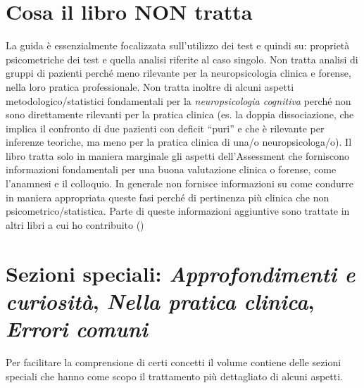 \documentclass[
  italian,
  letterpaper,
  paper=6in:9in,
  pagesize=pdftex,
  headinclude=on,
  footinclude=on,
  11pt]{scrbook}
\begin{document}
\section*{Cosa il libro NON tratta}\label{cosa-il-libro-non-tratta}


La guida è essenzialmente focalizzata sull'utilizzo dei test e quindi
su: proprietà psicometriche dei test e quella analisi riferite al caso
singolo. Non tratta analisi di gruppi di pazienti perché meno rilevante
per la neuropsicologia clinica e forense, nella loro pratica
professionale. Non tratta inoltre di alcuni aspetti
metodologico/statistici fondamentali per la \emph{neuropsicologia
cognitiva} perché non sono direttamente rilevanti per la pratica clinica
(es. la doppia dissociazione, che implica il confronto di due pazienti
con deficit ``puri'' e che è rilevante per inferenze teoriche, ma meno
per la pratica clinica di una/o neuropsicologa/o). Il libro tratta solo
in maniera marginale gli aspetti dell'Assessment che forniscono
informazioni fondamentali per una buona valutazione clinica o forense,
come l'anamnesi e il colloquio. In generale non fornisce informazioni su
come condurre in maniera appropriata queste fasi perché di pertinenza
più clinica che non psicometrico/statistica. Parte di queste
informazioni aggiuntive sono trattate in altri libri a cui ho
contribuito
(\cite{mondini2009valutazione,mondini2016semeiotica,mondini2022methodology})

\section*{\texorpdfstring{Sezioni speciali: \emph{Approfondimenti e
curiosità}, \emph{Nella pratica clinica}, \emph{Errori
comuni}}{Sezioni speciali: Approfondimenti e curiosità, Nella pratica clinica, Errori comuni}}\label{sezioni-speciali-approfondimenti-e-curiosituxe0-nella-pratica-clinica-errori-comuni}


Per facilitare la comprensione di certi concetti il volume contiene
delle sezioni speciali che hanno come scopo il trattamento più
dettagliato di alcuni aspetti.
\end{document}
